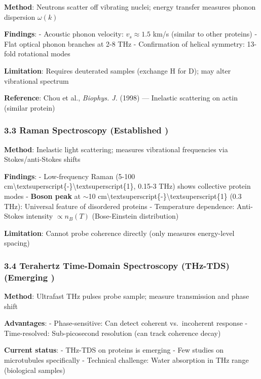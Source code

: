 \textbf{Method}: Neutrons scatter off vibrating nuclei; energy transfer
measures phonon dispersion \(\omega(k)\)

\textbf{Findings}: - Acoustic phonon velocity: \(v_s \approx 1.5\) km/s
(similar to other proteins) - Flat optical phonon branches at 2-8 THz -
Confirmation of helical symmetry: 13-fold rotational modes

\textbf{Limitation}: Requires deuterated samples (exchange H for D); may
alter vibrational spectrum

\textbf{Reference}: Chou et al., \emph{Biophys. J.} (1998) ---
Inelastic scattering on actin (similar protein)

\subsubsection{3.3 Raman Spectroscopy (Established
)}\label{raman-spectroscopy-established}

\textbf{Method}: Inelastic light scattering; measures vibrational
frequencies via Stokes/anti-Stokes shifts

\textbf{Findings}: - Low-frequency Raman (5-100
cm\textbackslash textsuperscript\{-\}\textbackslash textsuperscript\{1\},
0.15-3 THz) shows collective protein modes - \textbf{Boson peak} at
$\sim$10
cm\textbackslash textsuperscript\{-\}\textbackslash textsuperscript\{1\}
(0.3 THz): Universal feature of disordered proteins - Temperature
dependence: Anti-Stokes intensity \(\propto n_B(T)\) (Bose-Einstein
distribution)

\textbf{Limitation}: Cannot probe coherence directly (only measures
energy-level spacing)

\subsubsection{3.4 Terahertz Time-Domain Spectroscopy (THz-TDS)
(Emerging )}\label{terahertz-time-domain-spectroscopy-thz-tds-emerging}

\textbf{Method}: Ultrafast THz pulses probe sample; measure transmission
and phase shift

\textbf{Advantages}: - Phase-sensitive: Can detect coherent
vs.~incoherent response - Time-resolved: Sub-picosecond resolution (can
track coherence decay)

\textbf{Current status}: - THz-TDS on proteins is emerging - Few studies
on microtubules specifically - Technical challenge: Water absorption in
THz range (biological samples)

